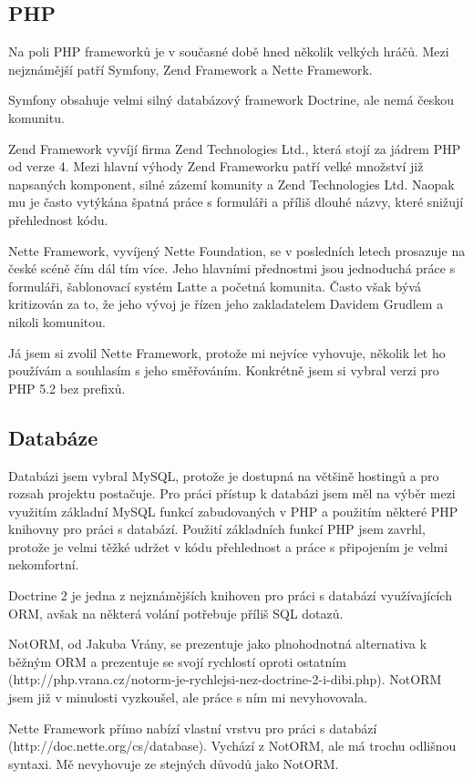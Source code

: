 \documentclass[thesis=B,czech]{FITthesis}[2011/06/14]
\begin{document}
\subsection{PHP}
Na poli PHP frameworků je v současné době hned několik velkých hráčů. Mezi nejznámější patří Symfony, Zend Framework a Nette Framework.

Symfony obsahuje velmi silný databázový framework Doctrine, ale nemá českou komunitu.

Zend Framework vyvíjí firma Zend Technologies Ltd., která stojí za jádrem PHP od verze 4. Mezi hlavní výhody Zend Frameworku patří velké množství již napsaných komponent, silné zázemí komunity a Zend Technologies Ltd. Naopak mu je často vytýkána špatná práce s formuláři a příliš dlouhé názvy, které snižují přehlednost kódu. 

Nette Framework, vyvíjený Nette Foundation, se v posledních letech prosazuje na české scéně čím dál tím více. Jeho hlavními přednostmi jsou jednoduchá práce s formuláři, šablonovací systém Latte a početná komunita. Často však bývá kritizován za to, že jeho vývoj je řízen jeho zakladatelem Davidem Grudlem a nikoli komunitou.

Já jsem si zvolil Nette Framework, protože mi nejvíce vyhovuje, několik let ho používám a souhlasím s jeho směřováním. Konkrétně jsem si vybral verzi pro PHP 5.2 bez prefixů.

\subsection{Databáze}
Databázi jsem vybral MySQL, protože je dostupná na většině hostingů a pro rozsah projektu postačuje. Pro práci přístup k databázi jsem měl na výběr mezi využitím základní MySQL funkcí zabudovaných v PHP a použitím některé PHP knihovny pro práci s databází. Použití základních funkcí PHP jsem zavrhl, protože je velmi těžké udržet v kódu přehlednost a práce s připojením je velmi nekomfortní.  

Doctrine 2 je jedna z nejznámějších knihoven pro práci s databází využívajících ORM, avšak na některá volání potřebuje příliš SQL dotazů.

NotORM, od Jakuba Vrány, se prezentuje jako plnohodnotná alternativa k běžným ORM a prezentuje se svojí rychlostí oproti ostatním (http://php.vrana.cz/notorm-je-rychlejsi-nez-doctrine-2-i-dibi.php). NotORM jsem již v minulosti vyzkoušel, ale práce s ním mi nevyhovovala. 

Nette Framework přímo nabízí vlastní vrstvu pro práci s databází (http://doc.nette.org/cs/database). Vychází z NotORM, ale má trochu odlišnou syntaxi. Mě nevyhovuje ze stejných důvodů jako NotORM.
\end{document}
